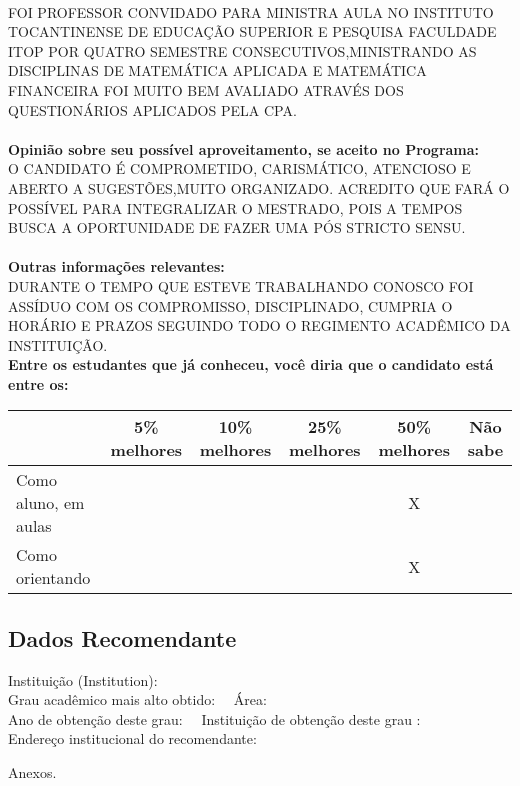 \documentclass[11pt]{article}
\begin{document}
\\FOI PROFESSOR CONVIDADO PARA MINISTRA AULA NO INSTITUTO TOCANTINENSE DE EDUCAÇÃO SUPERIOR E PESQUISA FACULDADE ITOP POR QUATRO SEMESTRE CONSECUTIVOS,MINISTRANDO AS DISCIPLINAS DE MATEMÁTICA APLICADA E MATEMÁTICA FINANCEIRA FOI MUITO BEM AVALIADO ATRAVÉS DOS QUESTIONÁRIOS APLICADOS PELA CPA.\\
\\
\textbf{Opinião sobre seu possível aproveitamento, se aceito no Programa:}
\\O CANDIDATO É COMPROMETIDO, CARISMÁTICO, ATENCIOSO E ABERTO A SUGESTÕES,MUITO ORGANIZADO. ACREDITO QUE FARÁ O POSSÍVEL PARA INTEGRALIZAR O MESTRADO, POIS A TEMPOS BUSCA A OPORTUNIDADE DE FAZER UMA PÓS STRICTO SENSU.\\ 
\\
\textbf{Outras informações relevantes:} \\DURANTE O TEMPO QUE ESTEVE TRABALHANDO CONOSCO FOI ASSÍDUO COM OS COMPROMISSO, DISCIPLINADO, CUMPRIA O HORÁRIO E PRAZOS SEGUINDO TODO O REGIMENTO ACADÊMICO DA INSTITUIÇÃO.
\\[0.3cm]
\textbf{Entre os estudantes que já conheceu, você diria que o candidato está entre os:}
\\
\begin{tabular}{|l|c|c|c|c|c|}
\hline
 & 5\% melhores & 10\% melhores & 25\% melhores & 50\% melhores & Não sabe \\
\hline
Como aluno, em aulas &  &  &  & X & \\
\hline
Como orientando &  &  &  & X & \\
\hline
\end{tabular}
\subsection*{Dados Recomendante} 
	Instituição (Institution): 
\\ 
	Grau acadêmico mais alto obtido: 
	\ \ Área: 
	\\
	Ano de obtenção deste grau: 
	\ \ 
	Instituição de obtenção deste grau : 
	\\ 
	Endereço institucional do recomendante: \\  
\begin{center}
Anexos.
\end{center}
\end{document}
